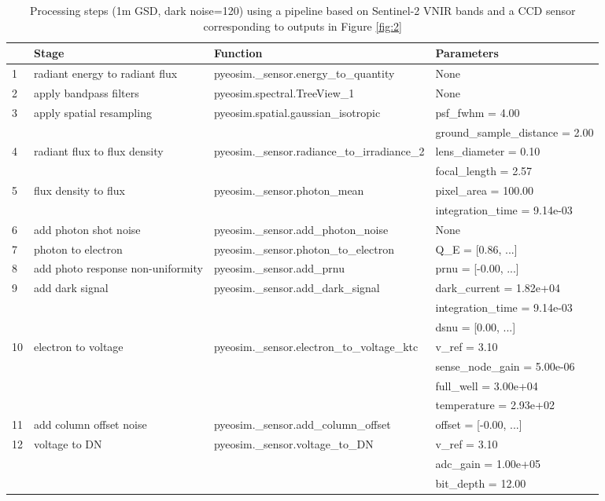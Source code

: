 \documentclass[10pt,a4paper,final,twocolumn]{article}
\begin{document}
\begin{table*}
\caption{Processing steps (1m GSD, dark noise=120) using a pipeline based on Sentinel-2 VNIR bands and a CCD sensor corresponding to outputs in Figure \ref{fig:2} }
\small
\begin{tabular}{llll}
\toprule
 & \bf{Stage} & \bf{Function} & \bf{Parameters} \\
\midrule
1 & radiant energy to radiant flux & pyeosim.\_sensor.energy\_to\_quantity & None\\
\midrule
2 & apply bandpass filters & pyeosim.spectral.TreeView\_1 & None\\
\midrule
3 & apply spatial resampling & pyeosim.spatial.gaussian\_isotropic & psf\_fwhm = 4.00\\
 & & & ground\_sample\_distance = 2.00\\
\midrule
4 & radiant flux to flux density & pyeosim.\_sensor.radiance\_to\_irradiance\_2 & lens\_diameter = 0.10\\
 & & & focal\_length = 2.57\\
\midrule
5 & flux density to flux & pyeosim.\_sensor.photon\_mean & pixel\_area = 100.00\\
 & & & integration\_time = 9.14e-03\\
\midrule
6 & add photon shot noise & pyeosim.\_sensor.add\_photon\_noise & None\\
\midrule
7 & photon to electron & pyeosim.\_sensor.photon\_to\_electron & Q\_E = [0.86, ...]\\
\midrule
8 & add photo response non-uniformity & pyeosim.\_sensor.add\_prnu & prnu = [-0.00, ...]\\
\midrule
9 & add dark signal & pyeosim.\_sensor.add\_dark\_signal & dark\_current = 1.82e+04\\
 & & & integration\_time = 9.14e-03\\
 & & & dsnu = [0.00, ...]\\
\midrule
10 & electron to voltage & pyeosim.\_sensor.electron\_to\_voltage\_ktc & v\_ref = 3.10\\
 & & & sense\_node\_gain = 5.00e-06\\
 & & & full\_well = 3.00e+04\\
 & & & temperature = 2.93e+02\\
\midrule
11 & add column offset noise & pyeosim.\_sensor.add\_column\_offset & offset = [-0.00, ...]\\
\midrule
12 & voltage to DN & pyeosim.\_sensor.voltage\_to\_DN & v\_ref = 3.10\\
 & & & adc\_gain = 1.00e+05\\
 & & & bit\_depth = 12.00\\
\midrule
\bottomrule
\end{tabular}

\label{tab:params2}
\end{table*}
\end{document}
